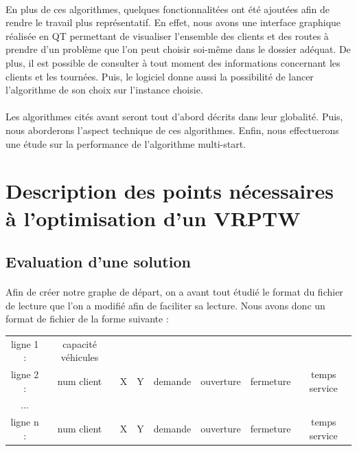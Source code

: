 \documentclass[12pt]{article}
\begin{document}
\paragraph{}
En plus de ces algorithmes, quelques fonctionnalitées ont été ajoutées afin de rendre le travail plus représentatif. En effet, nous avons une interface 
graphique réalisée en QT permettant de visualiser l'ensemble des clients et des routes à prendre d'un problème que l'on peut choisir soi-même dans le
dossier adéquat. De plus, il est possible de consulter à tout moment des informations concernant les clients et les tournées. Puis, le logiciel donne 
aussi la possibilité de lancer l'algorithme de son choix sur l'instance choisie.

\paragraph{}
Les algorithmes cités avant seront tout d'abord décrits dans leur globalité. Puis, nous aborderons l'aspect technique de ces algorithmes. Enfin, 
nous effectuerons une étude sur la performance de l'algorithme multi-start.

\clearpage
\section{Description des points nécessaires à l’optimisation d’un VRPTW}

\subsection{Evaluation d'une solution}

\paragraph{}
Afin de créer notre graphe de départ, on a avant tout étudié le format du fichier de lecture que l'on a modifié afin de faciliter 
sa lecture. Nous avons donc un format de fichier de la forme suivante : \\

\begin{tabular}{ *{8}{c} }
   ligne 1 : & capacité véhicules &  & & & & &\\
   ligne 2 : & num client & X & Y & demande & ouverture & fermeture & temps service \\
   ... & & & & & & & \\
   ligne n : & num client & X & Y & demande & ouverture & fermeture & temps service \\
 \end{tabular}
\end{document}
